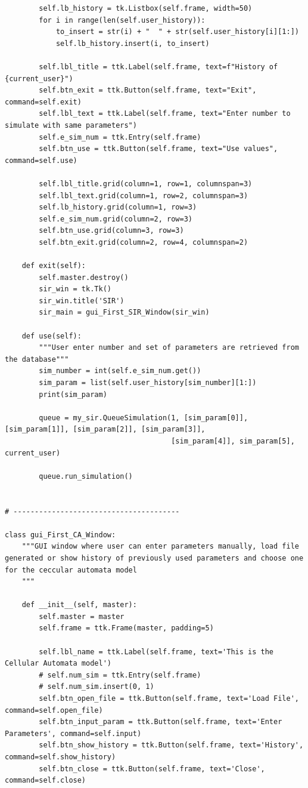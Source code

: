 \documentclass[11pt, a4paper]{article}
\begin{document}
\begin{lstlisting}
        self.lb_history = tk.Listbox(self.frame, width=50)
        for i in range(len(self.user_history)):
            to_insert = str(i) + "  " + str(self.user_history[i][1:])
            self.lb_history.insert(i, to_insert)

        self.lbl_title = ttk.Label(self.frame, text=f"History of {current_user}")
        self.btn_exit = ttk.Button(self.frame, text="Exit", command=self.exit)
        self.lbl_text = ttk.Label(self.frame, text="Enter number to simulate with same parameters")
        self.e_sim_num = ttk.Entry(self.frame)
        self.btn_use = ttk.Button(self.frame, text="Use values", command=self.use)

        self.lbl_title.grid(column=1, row=1, columnspan=3)
        self.lbl_text.grid(column=1, row=2, columnspan=3)
        self.lb_history.grid(column=1, row=3)
        self.e_sim_num.grid(column=2, row=3)
        self.btn_use.grid(column=3, row=3)
        self.btn_exit.grid(column=2, row=4, columnspan=2)

    def exit(self):
        self.master.destroy()
        sir_win = tk.Tk()
        sir_win.title('SIR')
        sir_main = gui_First_SIR_Window(sir_win)

    def use(self):
        """User enter number and set of parameters are retrieved from the database"""
        sim_number = int(self.e_sim_num.get())
        sim_param = list(self.user_history[sim_number][1:])
        print(sim_param)

        queue = my_sir.QueueSimulation(1, [sim_param[0]], [sim_param[1]], [sim_param[2]], [sim_param[3]],
                                       [sim_param[4]], sim_param[5], current_user)

        queue.run_simulation()


# ---------------------------------------

class gui_First_CA_Window:
    """GUI window where user can enter parameters manually, load file generated or show history of previously used parameters and choose one for the ceccular automata model
    """

    def __init__(self, master):
        self.master = master
        self.frame = ttk.Frame(master, padding=5)

        self.lbl_name = ttk.Label(self.frame, text='This is the Cellular Automata model')
        # self.num_sim = ttk.Entry(self.frame)
        # self.num_sim.insert(0, 1)
        self.btn_open_file = ttk.Button(self.frame, text='Load File', command=self.open_file)
        self.btn_input_param = ttk.Button(self.frame, text='Enter Parameters', command=self.input)
        self.btn_show_history = ttk.Button(self.frame, text='History', command=self.show_history)
        self.btn_close = ttk.Button(self.frame, text='Close', command=self.close)


\end{lstlisting}
\end{document}
